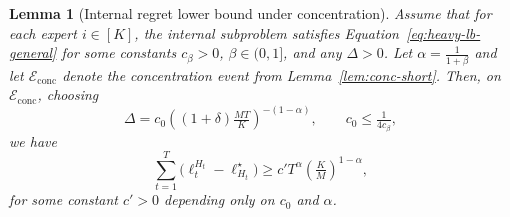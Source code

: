 \documentclass[a4paper,14pt]{extarticle}
\theoremstyle{plain}
\newtheorem{lemma}{Lemma}
\begin{document}
\begin{lemma}[Internal regret lower bound under concentration]
\label{lem:internal-lb-conc}
Assume that for each expert $i \in [K]$, the internal subproblem satisfies Equation~\ref{eq:heavy-lb-general}
for some constants $c_\beta>0$, $\beta\in(0,1]$, and any $\Delta>0$.
Let $\alpha = \tfrac{1}{1+\beta}$ and let $\mathcal{E}_{\mathrm{conc}}$ denote the concentration event from Lemma~\ref{lem:conc-short}.
Then, on $\mathcal{E}_{\mathrm{conc}}$, choosing
\begin{equation}
\label{eq:eps-choice}
\Delta = c_0\!\left((1+\delta)\tfrac{MT}{K}\right)^{-(1-\alpha)},
\qquad c_0 \le \tfrac{1}{4c_\beta},
\end{equation}
we have
\begin{equation}
\label{eq:internal-lb-final}
\sum_{t=1}^T \bigl(\ell_t^{H_t} - \ell_{H_t}^\star \bigr)
\ge
c'T^{\alpha}\!\left(\tfrac{K}{M}\right)^{1-\alpha},
\end{equation}
for some constant $c'>0$ depending only on $c_0$ and $\alpha$.
\end{lemma}
\end{document}
